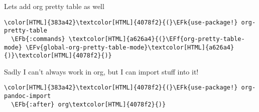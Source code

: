 \documentclass{scrartcl}
\newcommand{\EFk}[1]{\textcolor{EFk}{#1}} %
\newcommand{\EFb}[1]{\textcolor{EFb}{#1}} %
\newcommand{\EFv}[1]{\textcolor{EFv}{#1}} %
\newcommand{\EFf}[1]{\textcolor{EFf}{#1}} %
\begin{document}
Lets add org pretty table as well
\begin{Code}
\begin{Verbatim}[]
\color[HTML]{383a42}\textcolor[HTML]{4078f2}{(}\EFk{use-package!} org-pretty-table
  \EFb{:commands} \textcolor[HTML]{a626a4}{(}\EFf{org-pretty-table-mode} \EFv{global-org-pretty-table-mode}\textcolor[HTML]{a626a4}{)}\textcolor[HTML]{4078f2}{)}
\end{Verbatim}
\end{Code}

Sadly I can't always work in org, but I can import stuff into it!
\begin{Code}
\begin{Verbatim}[]
\color[HTML]{383a42}\textcolor[HTML]{4078f2}{(}\EFk{use-package!} org-pandoc-import
  \EFb{:after} org\textcolor[HTML]{4078f2}{)}
\end{Verbatim}
\end{Code}
\end{document}
